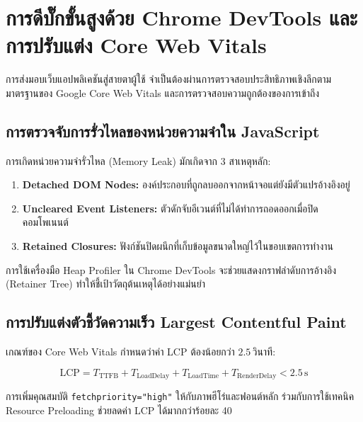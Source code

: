 \chapter{การดีบั๊กขั้นสูงด้วย Chrome DevTools และการปรับแต่ง Core Web Vitals}

การส่งมอบเว็บแอปพลิเคชันสู่สายตาผู้ใช้ จำเป็นต้องผ่านการตรวจสอบประสิทธิภาพเชิงลึกตามมาตรฐานของ Google Core Web Vitals และการตรวจสอบความถูกต้องของการเข้าถึง

\section{การตรวจจับการรั่วไหลของหน่วยความจำใน JavaScript}

การเกิดหน่วยความจำรั่วไหล (Memory Leak) มักเกิดจาก 3 สาเหตุหลัก:
\begin{enumerate}
    \item \textbf{Detached DOM Nodes:} องค์ประกอบที่ถูกลบออกจากหน้าจอแต่ยังมีตัวแปรอ้างอิงอยู่
    \item \textbf{Uncleared Event Listeners:} ตัวดักจับอีเวนต์ที่ไม่ได้ทำการถอดออกเมื่อปิดคอมโพเนนต์
    \item \textbf{Retained Closures:} ฟังก์ชันปิดผนึกที่เก็บข้อมูลขนาดใหญ่ไว้ในขอบเขตการทำงาน
\end{enumerate}

การใช้เครื่องมือ Heap Profiler ใน Chrome DevTools จะช่วยแสดงกราฟลำดับการอ้างอิง (Retainer Tree) ทำให้ชี้เป้าวัตถุต้นเหตุได้อย่างแม่นยำ

\section{การปรับแต่งตัวชี้วัดความเร็ว Largest Contentful Paint}

เกณฑ์ของ Core Web Vitals กำหนดว่าค่า LCP ต้องน้อยกว่า $2.5\,\text{วินาที}$:

\begin{equation}
\text{LCP} = T_{\text{TTFB}} + T_{\text{LoadDelay}} + T_{\text{LoadTime}} + T_{\text{RenderDelay}} < 2.5\,\text{s}
\end{equation}

การเพิ่มคุณสมบัติ \texttt{fetchpriority="high"} ให้กับภาพฮีโร่และฟอนต์หลัก ร่วมกับการใช้เทคนิค Resource Preloading ช่วยลดค่า LCP ได้มากกว่าร้อยละ 40
